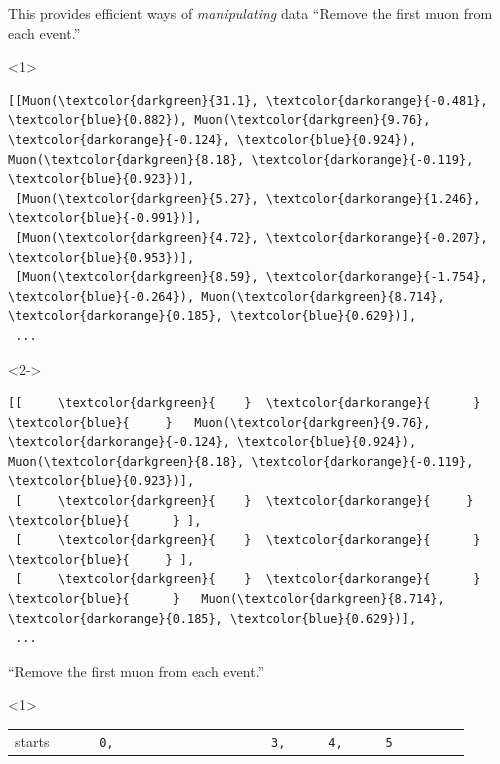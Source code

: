 \documentclass[aspectratio=169]{beamer}
\begin{document}
\begin{frame}[fragile]{This provides efficient ways of {\it manipulating} data}
\vspace{0.25 cm}
``Remove the first muon from each event.'' 
\scriptsize
\begin{onlyenv}<1>
\begin{Verbatim}[commandchars=\\\{\}]
[[Muon(\textcolor{darkgreen}{31.1}, \textcolor{darkorange}{-0.481}, \textcolor{blue}{0.882}), Muon(\textcolor{darkgreen}{9.76}, \textcolor{darkorange}{-0.124}, \textcolor{blue}{0.924}), Muon(\textcolor{darkgreen}{8.18}, \textcolor{darkorange}{-0.119}, \textcolor{blue}{0.923})],
 [Muon(\textcolor{darkgreen}{5.27}, \textcolor{darkorange}{1.246}, \textcolor{blue}{-0.991})],
 [Muon(\textcolor{darkgreen}{4.72}, \textcolor{darkorange}{-0.207}, \textcolor{blue}{0.953})],
 [Muon(\textcolor{darkgreen}{8.59}, \textcolor{darkorange}{-1.754}, \textcolor{blue}{-0.264}), Muon(\textcolor{darkgreen}{8.714}, \textcolor{darkorange}{0.185}, \textcolor{blue}{0.629})],
 ...
\end{Verbatim}
\end{onlyenv}\begin{onlyenv}<2->
\begin{Verbatim}[commandchars=\\\{\}]
[[     \textcolor{darkgreen}{    }  \textcolor{darkorange}{      }  \textcolor{blue}{     }   Muon(\textcolor{darkgreen}{9.76}, \textcolor{darkorange}{-0.124}, \textcolor{blue}{0.924}), Muon(\textcolor{darkgreen}{8.18}, \textcolor{darkorange}{-0.119}, \textcolor{blue}{0.923})],
 [     \textcolor{darkgreen}{    }  \textcolor{darkorange}{     }  \textcolor{blue}{      } ],
 [     \textcolor{darkgreen}{    }  \textcolor{darkorange}{      }  \textcolor{blue}{     } ],
 [     \textcolor{darkgreen}{    }  \textcolor{darkorange}{      }  \textcolor{blue}{      }   Muon(\textcolor{darkgreen}{8.714}, \textcolor{darkorange}{0.185}, \textcolor{blue}{0.629})],
 ...
\end{Verbatim}
\end{onlyenv}
\normalsize
\vspace{0.5 cm}
``Remove the first muon from each event.'' 
\vspace{0.25 cm}
\begin{onlyenv}<1>
\begin{tabular}{r l}
\small starts  &                    {\tt\scriptsize \ \ \ \ \ 0,\ \ \ \ \ \ \ \ \ \ \ \ \ \ \ \ \ \ \ \ \ \ 3,\ \ \ \ \ \ 4,\ \ \ \ \ \ 5\ \ \ \ \ \ \ \ \ } \\

\end{tabular}
\end{onlyenv}
\end{frame}
\end{document}
